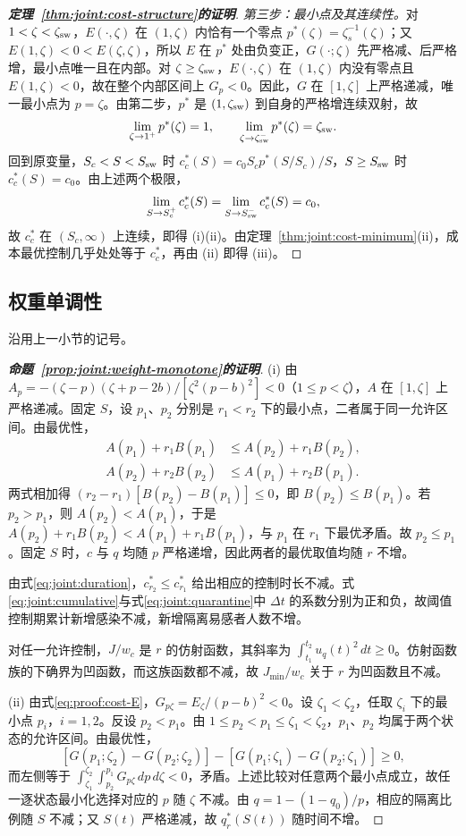 \begin{proof}[\normalfont\bfseries 定理~\ref{thm:joint:cost-structure}的证明]
\emph{第三步：最小点及其连续性。}对 $1<\zeta<\zeta_{\rm sw}$，$E(\cdot,\zeta)$ 在 $(1,\zeta)$ 内恰有一个零点 $p^*(\zeta)=\zeta_s^{-1}(\zeta)$；又 $E(1,\zeta)<0<E(\zeta,\zeta)$，所以 $E$ 在 $p^*$ 处由负变正，$G(\cdot;\zeta)$ 先严格减、后严格增，最小点唯一且在内部。对 $\zeta\ge\zeta_{\rm sw}$，$E(\cdot,\zeta)$ 在 $(1,\zeta)$ 内没有零点且 $E(1,\zeta)<0$，故在整个内部区间上 $G_p<0$。因此，$G$ 在 $[1,\zeta]$ 上严格递减，唯一最小点为 $p=\zeta$。由第二步，$p^*$ 是 $(1,\zeta_{\rm sw})$ 到自身的严格增连续双射，故
\[
\lim_{\zeta\to1^{+}}p^*(\zeta)=1,\qquad
\lim_{\zeta\to\zeta_{\rm sw}^{-}}p^*(\zeta)=\zeta_{\rm sw}.
\]
回到原变量，$S_c<S<S_{\rm sw}$ 时 $c_c^*(S)=c_0S_cp^*(S/S_c)/S$，$S\ge S_{\rm sw}$ 时 $c_c^*(S)=c_0$。由上述两个极限，
\[
\lim_{S\to S_c^{+}}c_c^*(S)=\lim_{S\to S_{\rm sw}^{-}}c_c^*(S)=c_0,
\]
故 $c_c^*$ 在 $(S_c,\infty)$ 上连续，即得 (i)(ii)。由定理~\ref{thm:joint:cost-minimum}(ii)，成本最优控制几乎处处等于 $c_c^*$，再由 (ii) 即得 (iii)。
\end{proof}

\subsection{权重单调性}
\label{sec:proof:weight-monotone}
沿用上一小节的记号。
\begin{proof}[\normalfont\bfseries 命题~\ref{prop:joint:weight-monotone}的证明]
(i) 由 $A_p=-(\zeta-p)(\zeta+p-2b)/[\zeta^2(p-b)^2]<0$（$1\le p<\zeta$），$A$ 在 $[1,\zeta]$ 上严格递减。固定 $S$，设 $p_1$、$p_2$ 分别是 $r_1<r_2$ 下的最小点，二者属于同一允许区间。由最优性，
\[
\begin{aligned}
A(p_1)+r_1B(p_1)&\le A(p_2)+r_1B(p_2),\\
A(p_2)+r_2B(p_2)&\le A(p_1)+r_2B(p_1).
\end{aligned}
\]
两式相加得 $(r_2-r_1)[B(p_2)-B(p_1)]\le0$，即 $B(p_2)\le B(p_1)$。若 $p_2>p_1$，则 $A(p_2)<A(p_1)$，于是 $A(p_2)+r_1B(p_2)<A(p_1)+r_1B(p_1)$，与 $p_1$ 在 $r_1$ 下最优矛盾。故 $p_2\le p_1$。固定 $S$ 时，$c$ 与 $q$ 均随 $p$ 严格递增，因此两者的最优取值均随 $r$ 不增。

由式\eqref{eq:joint:duration}，$c_{r_2}^*\le c_{r_1}^*$ 给出相应的控制时长不减。式\eqref{eq:joint:cumulative}与式\eqref{eq:joint:quarantine}中 $\Delta t$ 的系数分别为正和负，故阈值控制期累计新增感染不减，新增隔离易感者人数不增。

对任一允许控制，$J/w_c$ 是 $r$ 的仿射函数，其斜率为 $\int_{t_1}^{t_2}u_q(t)^2\,dt\ge0$。仿射函数族的下确界为凹函数，而这族函数都不减，故 $J_{\min}/w_c$ 关于 $r$ 为凹函数且不减。

(ii) 由式\eqref{eq:proof:cost-E}，$G_{p\zeta}=E_\zeta/(p-b)^2<0$。设 $\zeta_1<\zeta_2$，任取 $\zeta_i$ 下的最小点 $p_i$，$i=1,2$。反设 $p_2<p_1$。由 $1\le p_2<p_1\le\zeta_1<\zeta_2$，$p_1$、$p_2$ 均属于两个状态的允许区间。由最优性，
\[
[G(p_1;\zeta_2)-G(p_2;\zeta_2)]-[G(p_1;\zeta_1)-G(p_2;\zeta_1)]\ge0,
\]
而左侧等于 $\int_{\zeta_1}^{\zeta_2}\int_{p_2}^{p_1}G_{p\zeta}\,dp\,d\zeta<0$，矛盾。上述比较对任意两个最小点成立，故任一逐状态最小化选择对应的 $p$ 随 $\zeta$ 不减。由 $q=1-(1-q_0)/p$，相应的隔离比例随 $S$ 不减；又 $S(t)$ 严格递减，故 $q_r^*(S(t))$ 随时间不增。
\end{proof}

